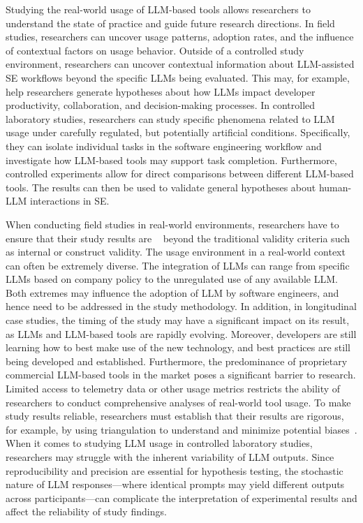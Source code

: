 Studying the real-world usage of LLM-based tools allows researchers to understand the state of practice and guide future research directions.
In field studies, researchers can uncover usage patterns, adoption rates, and the influence of contextual factors on usage behavior.
Outside of a controlled study environment, researchers can uncover contextual information about LLM-assisted SE workflows beyond the specific LLMs being evaluated.
This may, for example, help researchers generate hypotheses about how LLMs impact developer productivity, collaboration, and decision-making processes.
In controlled laboratory studies, researchers can study specific phenomena related to LLM usage under carefully regulated, but potentially artificial conditions.
Specifically, they can isolate individual tasks in the software engineering workflow and investigate how LLM-based tools may support task completion.
Furthermore, controlled experiments allow for direct comparisons between different LLM-based tools.
The results can then be used to validate general hypotheses about human-LLM interactions in SE.


When conducting field studies in real-world environments, researchers have to ensure that their study results are ~\cite{Sullivan2011-ub} beyond the traditional validity criteria such as internal or construct validity.
The usage environment in a real-world context can often be extremely diverse.
The integration of LLMs can range from specific LLMs based on company policy to the unregulated use of any available LLM. 
Both extremes may influence the adoption of LLM by software engineers, and hence need to be addressed in the study methodology.
In addition, in longitudinal case studies, the timing of the study may have a significant impact on its result, as LLMs and LLM-based tools are rapidly evolving.
Moreover, developers are still learning how to best make use of the new technology, and best practices are still being developed and established.
Furthermore, the predominance of proprietary commercial LLM-based tools in the market poses a significant barrier to research.
Limited access to telemetry data or other usage metrics restricts the ability of researchers to conduct comprehensive analyses of real-world tool usage.
To make study results reliable, researchers must establish that their results are rigorous, for example, by using triangulation to understand and minimize potential biases~\cite{Sullivan2011-ub}.
When it comes to studying LLM usage in controlled laboratory studies, researchers may struggle with the inherent variability of LLM outputs.
Since reproducibility and precision are essential for hypothesis testing, the stochastic nature of LLM responses---where identical prompts may yield different outputs across participants---can complicate the interpretation of experimental results and affect the reliability of study findings.
